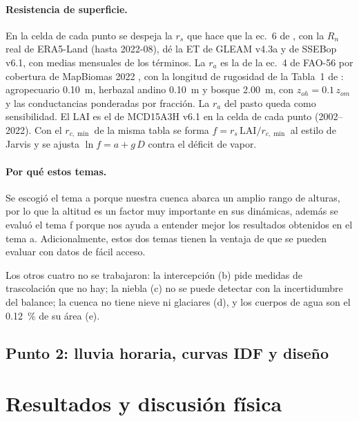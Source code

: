 \documentclass[11pt,letterpaper]{article}
\begin{document}
\paragraph{Resistencia de superficie.} En la celda de cada punto se despeja la $r_s$ que hace que la ec.~6 de
\citet{allen1998}, con la $R_n$ real de ERA5-Land (hasta 2022-08), dé la ET de GLEAM v4.3a y de SSEBop v6.1, con medias
mensuales de los términos. La $r_a$ es la de la ec.~4 de FAO-56 por cobertura de MapBiomas 2022 \citep{mapbiomas_col3}, con la longitud de rugosidad
de la Tabla~1 de \citet{gehrke2021}: agropecuario 0.10~m, herbazal andino 0.10~m y bosque 2.00~m, con $z_{oh} =
0.1\,z_{om}$ y las conductancias ponderadas por fracción. La $r_a$ del pasto queda como sensibilidad. El LAI es el de
MCD15A3H v6.1 \citep{myneni2021} en la celda de cada punto (2002--2022). Con el $r_{c,\min}$ de la misma tabla se forma
$f = r_s\,\mathrm{LAI}/r_{c,\min}$ al estilo de Jarvis y se ajusta $\ln f = a + g\,D$ contra el déficit de vapor.

\paragraph{Por qué estos temas.}
Se escogió el tema a porque nuestra cuenca abarca un amplio rango de alturas, por lo que la altitud es un factor muy
importante en sus dinámicas, además se evaluó el tema f porque nos ayuda a entender mejor los resultados obtenidos en
el tema a. Adicionalmente, estos dos temas tienen la ventaja de que se pueden evaluar con datos de fácil acceso.

Los otros cuatro no se trabajaron: la intercepción (b) pide medidas de trascolación que no hay; la niebla (c) no se
puede detectar con la incertidumbre del balance; la cuenca no tiene nieve ni glaciares (d), y los cuerpos de agua son
el 0.12~\% de su área (e).

\subsection{Punto 2: lluvia horaria, curvas IDF y diseño}


\section{Resultados y discusión física}
\end{document}
